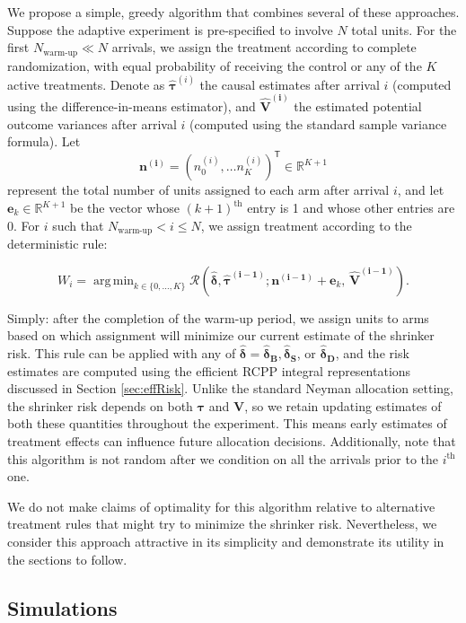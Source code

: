 \documentclass{article}
\newcommand{\bstau}{\boldsymbol \tau}
\newcommand{\hbstau}{\boldsymbol{\hat \tau}}
\newcommand{\bsdeltad}{\boldsymbol{\hat \delta_{\textbf{D}}}}
\newcommand{\bsdelt}{\boldsymbol{\hat \delta}}
\newcommand{\bsdeltb}{\boldsymbol {\hat \delta_B}}
\newcommand{\bsdelts}{\boldsymbol {\hat \delta_S}}
\newcommand{\tran}{\mathsf{T}}
\DeclareMathOperator*{\argmin}{arg\,min}
\begin{document}
We propose a simple, greedy algorithm that combines several of these approaches. Suppose the adaptive experiment is pre-specified to involve $N$ total units. For the first $N_{\text{warm-up}} \ll N$ arrivals, we assign the treatment according to complete randomization, with equal probability of receiving the control or any of the $K$ active treatments. Denote as $\hbstau^{(i)}$ the causal estimates after arrival $i$ (computed using the difference-in-means estimator), and $\boldsymbol{\hat V^{(i)}}$ the estimated potential outcome variances after arrival $i$ (computed using the standard sample variance formula). Let 
\[ \boldsymbol{n^{(i)}} = \left(n_0^{(i)}, \dots n_K^{(i)} \right)^\tran \in \mathbb{R}^{K + 1}\] 
represent the total number of units assigned to each arm after arrival $i$, and let $\boldsymbol e_k \in \mathbb{R}^{K + 1}$ be the vector whose $(k + 1)^\text{th}$ entry is 1 and whose other entries are $0$. For $i$ such that $N_{\text{warm-up}} < i \leq N$, we assign treatment according to the deterministic rule: 

\[ W_i = \argmin_{k \in \{0,\dots,K\}} \mathcal{R} \left( \bsdelt, \boldsymbol{\hat \tau^{(i-1)}}; \boldsymbol{n^{(i - 1)}} +\boldsymbol e_k,\, \boldsymbol{\hat V^{(i - 1)}} \right). \]

Simply: after the completion of the warm-up period, we assign units to arms based on which assignment will minimize our current estimate of the shrinker risk. This rule can be applied with any of $\bsdelt = \bsdeltb, \bsdelts$, or $\bsdeltad$, and the risk estimates are computed using the efficient RCPP integral representations discussed in Section \ref{sec:effRisk}. Unlike the standard Neyman allocation setting, the shrinker risk depends on both $\bstau$ and $\boldsymbol V$, so we retain updating estimates of both these quantities throughout the experiment. This means early estimates of treatment effects can influence future allocation decisions. Additionally, note that this algorithm is not random after we condition on all the arrivals prior to the $i^\text{th}$ one. 

We do not make claims of optimality for this algorithm relative to alternative treatment rules that might try to minimize the shrinker risk. Nevertheless, we consider this approach attractive in its simplicity and demonstrate its utility in the sections to follow. 

\subsection{Simulations}
\end{document}
